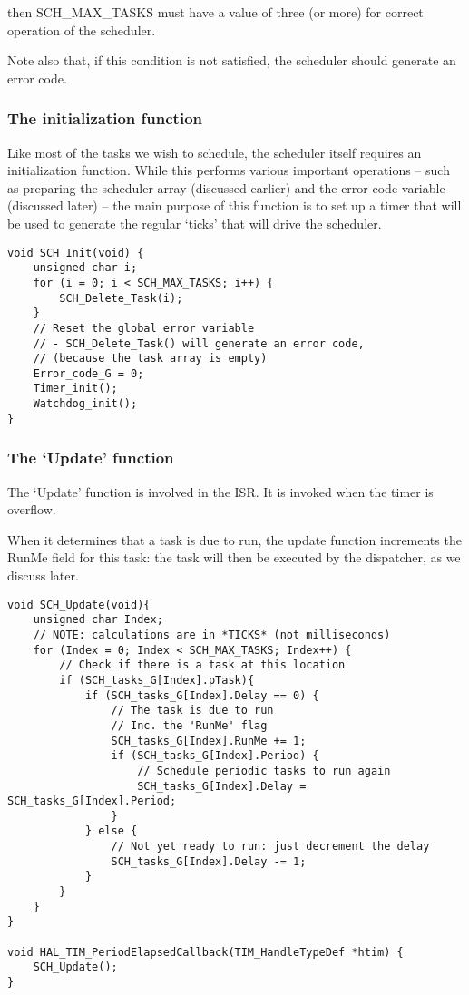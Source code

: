 then SCH\_MAX\_TASKS must have a value of three (or more) for correct operation of
the scheduler.

Note also that, if this condition is not satisfied, the scheduler should generate an
error code.
\subsubsection{The initialization function}
Like most of the tasks we wish to schedule, the scheduler itself requires an initialization function. While this performs various important operations – such as preparing
the scheduler array (discussed earlier) and the error code variable (discussed later) –
the main purpose of this function is to set up a timer that will be used to generate the
regular ‘ticks’ that will drive the scheduler.

\begin{lstlisting}[basicstyle=\small, caption=Example of how]
void SCH_Init(void) {
    unsigned char i;
    for (i = 0; i < SCH_MAX_TASKS; i++) {
        SCH_Delete_Task(i);
    }
    // Reset the global error variable
    // - SCH_Delete_Task() will generate an error code, 
    // (because the task array is empty)
    Error_code_G = 0;
    Timer_init();
    Watchdog_init();
}
\end{lstlisting}
\subsubsection{The ‘Update’ function}
The ‘Update’ function is involved in the ISR. It is invoked when the timer is overflow.

When it determines that a task is due to run, the update function increments the
RunMe field for this task: the task will then be executed by the dispatcher, as we discuss later.
\begin{lstlisting}[basicstyle=\small, caption=Example of how to write an SCH\_Update function]
void SCH_Update(void){
    unsigned char Index;
    // NOTE: calculations are in *TICKS* (not milliseconds)
    for (Index = 0; Index < SCH_MAX_TASKS; Index++) {
        // Check if there is a task at this location
        if (SCH_tasks_G[Index].pTask){
            if (SCH_tasks_G[Index].Delay == 0) {
                // The task is due to run
                // Inc. the 'RunMe' flag
                SCH_tasks_G[Index].RunMe += 1; 
                if (SCH_tasks_G[Index].Period) {
                    // Schedule periodic tasks to run again
                    SCH_tasks_G[Index].Delay = SCH_tasks_G[Index].Period;
                } 
            } else {
                // Not yet ready to run: just decrement the delay 
                SCH_tasks_G[Index].Delay -= 1;
            }
        } 
    }
}

void HAL_TIM_PeriodElapsedCallback(TIM_HandleTypeDef *htim) {
	SCH_Update();
}

\end{lstlisting}

